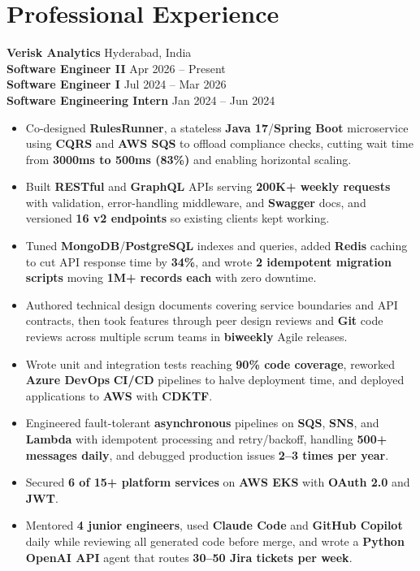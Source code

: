 \documentclass[a4paper,10pt]{article}
\begin{document}
\section*{Professional Experience}

\textbf{Verisk Analytics} \hfill Hyderabad, India \\
\textbf{Software Engineer II} \hfill Apr 2026 -- Present \\
\textbf{Software Engineer I} \hfill Jul 2024 -- Mar 2026 \\
\textbf{Software Engineering Intern} \hfill Jan 2024 -- Jun 2024

\begin{itemize}[leftmargin=*]
    \item Co-designed \textbf{RulesRunner}, a stateless \textbf{Java 17}/\textbf{Spring Boot} microservice using \textbf{CQRS} and \textbf{AWS SQS} to offload compliance checks, cutting wait time from \textbf{3000ms to 500ms (83\%)} and enabling horizontal scaling.
    \item Built \textbf{RESTful} and \textbf{GraphQL} APIs serving \textbf{200K+ weekly requests} with validation, error-handling middleware, and \textbf{Swagger} docs, and versioned \textbf{16 v2 endpoints} so existing clients kept working.
    \item Tuned \textbf{MongoDB}/\textbf{PostgreSQL} indexes and queries, added \textbf{Redis} caching to cut API response time by \textbf{34\%}, and wrote \textbf{2 idempotent migration scripts} moving \textbf{1M+ records each} with zero downtime.
    \item Authored technical design documents covering service boundaries and API contracts, then took features through peer design reviews and \textbf{Git} code reviews across multiple scrum teams in \textbf{biweekly} Agile releases.
    \item Wrote unit and integration tests reaching \textbf{90\% code coverage}, reworked \textbf{Azure DevOps} \textbf{CI/CD} pipelines to halve deployment time, and deployed applications to \textbf{AWS} with \textbf{CDKTF}.
    \item Engineered fault-tolerant \textbf{asynchronous} pipelines on \textbf{SQS}, \textbf{SNS}, and \textbf{Lambda} with idempotent processing and retry/backoff, handling \textbf{500+ messages daily}, and debugged production issues \textbf{2--3 times per year}.
    \item Secured \textbf{6 of 15+ platform services} on \textbf{AWS EKS} with \textbf{OAuth 2.0} and \textbf{JWT}.
    \item Mentored \textbf{4 junior engineers}, used \textbf{Claude Code} and \textbf{GitHub Copilot} daily while reviewing all generated code before merge, and wrote a \textbf{Python} \textbf{OpenAI API} agent that routes \textbf{30--50 Jira tickets per week}.
\end{itemize}
\end{document}
